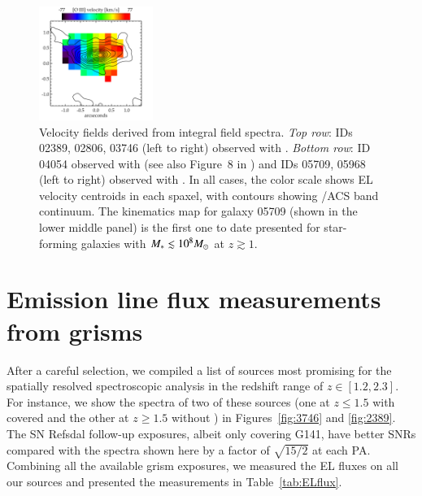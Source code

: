 \begin{figure}
    \includegraphics[width=0.33\textwidth]{fig_kinematics/v_593.pdf}
    \caption[Velocity fields derived from integral field spectra.]{Velocity fields derived from integral field spectra. \textit{Top row}: IDs
    02389, 02806, 03746 (left to right) observed with \muse. \textit{Bottom row}: ID 04054
    observed with \muse (see also Figure~8 in \citet{2016ApJ...822...78G}) and IDs 05709,
    05968 (left to right) observed with \kmos.  In all cases, the color scale shows EL
    velocity centroids in each spaxel, with contours showing \hst/ACS \I band continuum.
    The kinematics map for galaxy 05709 (shown in the lower middle panel) is the first one to
    date presented for star-forming galaxies with $M_\ast\lesssim10^8M_\odot$ at $z\gtrsim1$.}
    \label{fig:kinem}
\end{figure}


\section{Emission line flux measurements from \protect\hst grisms}\label{sect:ELflux}



After a careful selection, we compiled a list of sources most promising for the spatially resolved spectroscopic analysis in the 
redshift range of $z\in[1.2, 2.3]$.
For instance, we show the \glass spectra of two of these sources (one at $z\leq1.5$ with \Ha covered and the other at $z\geq1.5$ 
without \Ha) in Figures~\ref{fig:3746} and \ref{fig:2389}.
The SN Refsdal follow-up exposures, albeit only covering G141, have better SNRs compared with the spectra shown here by a factor 
of $\sqrt{15/2}$ at each PA.  Combining all the available grism exposures, we measured the EL fluxes on all our sources and 
presented the measurements in Table~\ref{tab:ELflux}.

